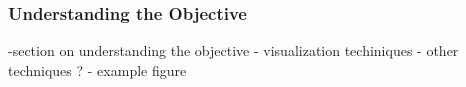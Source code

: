 \subsubsection*{Understanding the Objective}
-section on understanding the objective
    - visualization techiniques
    - other techniques ?
    - example figure 


